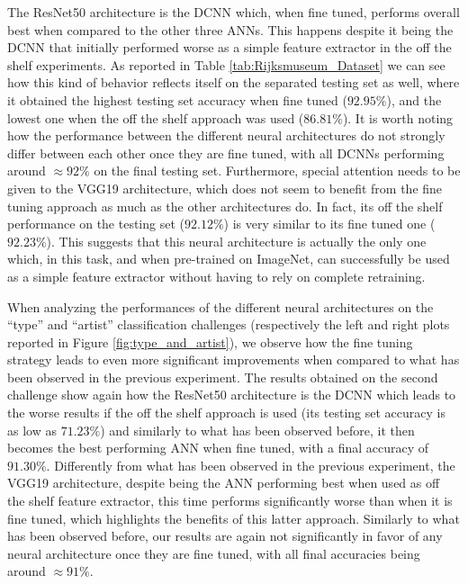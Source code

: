 \documentclass[runningheads]{llncs}
\begin{document}

The ResNet50 architecture is the DCNN which, when fine tuned, performs overall best when compared to the other three ANNs. This happens despite it being the DCNN that initially performed worse as a simple feature extractor in the off the shelf experiments. As reported in Table \ref{tab:Rijksmuseum_Dataset} we can see how this kind of behavior reflects itself on the separated testing set as well, where it obtained the highest testing set accuracy when fine tuned ($92.95\%$), and the lowest one when the off the shelf approach was used ($86.81\%$). It is worth noting how the performance between the different neural architectures do not strongly differ between each other once they are fine tuned, with all DCNNs performing around $\approx 92\%$ on the final testing set. Furthermore, special attention needs to be given to the VGG19 architecture, which does not seem to benefit from the fine tuning approach as much as the other architectures do. In fact, its off the shelf performance on the testing set ($92.12\%$) is very similar to its fine tuned one ($92.23\%$). This suggests that this neural architecture is actually the only one which, in this task, and when pre-trained on ImageNet, can successfully be used as a simple feature extractor without having to rely on complete retraining. 

When analyzing the performances of the different neural architectures on the ``type'' and ``artist'' classification challenges (respectively the left and right plots reported in Figure \ref{fig:type_and_artist}), we observe how the fine tuning strategy leads to even more significant improvements when compared to what has been observed in the previous experiment. The results obtained on the second challenge show again how the ResNet50 architecture is the DCNN which leads to the worse results if the off the shelf approach is used (its testing set accuracy is as low as $71.23\%$) and similarly to what has been observed before, it then becomes the best performing ANN when fine tuned, with a final accuracy of $91.30\%$. Differently from what has been observed in the previous experiment, the VGG19 architecture, despite being the ANN performing best when used as off the shelf feature extractor, this time performs significantly worse than when it is fine tuned, which highlights the benefits of this latter approach. Similarly to what has been observed before, our results are again not significantly in favor of any neural architecture once they are fine tuned, with all final accuracies being around $\approx 91\%$.
\end{document}
